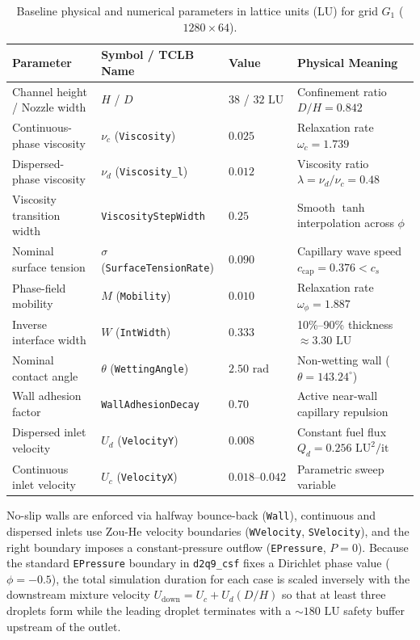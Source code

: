 \documentclass[11pt,a4paper]{article}
\begin{document}
\begin{table}[H]
\caption{Baseline physical and numerical parameters in lattice units (LU) for grid $G_1$ ($1280 \times 64$).}
\label{tab:setup}
\hspace{-1.5cm}
\begin{tabular}{@{}llll@{}}
\toprule
\textbf{Parameter} & \textbf{Symbol / TCLB Name} & \textbf{Value} & \textbf{Physical Meaning} \\
\midrule
Channel height / Nozzle width & $H$ / $D$ & $38$ / $32\text{ LU}$ & Confinement ratio $D/H = 0.842$ \\
Continuous-phase viscosity & $\nu_c$ (\texttt{Viscosity}) & $0.025$ & Relaxation rate $\omega_c = 1.739$ \\
Dispersed-phase viscosity & $\nu_d$ (\texttt{Viscosity\_l}) & $0.012$ & Viscosity ratio $\lambda = \nu_d/\nu_c = 0.48$ \\
Viscosity transition width & \texttt{ViscosityStepWidth} & $0.25$ & Smooth $\tanh$ interpolation across $\phi$ \\
Nominal surface tension & $\sigma$ (\texttt{SurfaceTensionRate}) & $0.090$ & Capillary wave speed $c_{\mathrm{cap}} = 0.376 < c_s$ \\
Phase-field mobility & $M$ (\texttt{Mobility}) & $0.010$ & Relaxation rate $\omega_\phi = 1.887$ \\
Inverse interface width & $W$ (\texttt{IntWidth}) & $0.333$ & 10\%--90\% thickness $\approx 3.30\text{ LU}$ \\
Nominal contact angle & $\theta$ (\texttt{WettingAngle}) & $2.50\text{ rad}$ & Non-wetting wall ($\theta = 143.24^\circ$) \\
Wall adhesion factor & \texttt{WallAdhesionDecay} & $0.70$ & Active near-wall capillary repulsion \\
Dispersed inlet velocity & $U_d$ (\texttt{VelocityY}) & $0.008$ & Constant fuel flux $Q_d = 0.256\text{ LU}^2/\text{it}$ \\
Continuous inlet velocity & $U_c$ (\texttt{VelocityX}) & $0.018\text{--}0.042$ & Parametric sweep variable \\
\bottomrule
\end{tabular}
\end{table}

No-slip walls are enforced via halfway bounce-back (\texttt{Wall}), continuous and dispersed inlets use Zou-He velocity boundaries (\texttt{WVelocity}, \texttt{SVelocity}), and the right boundary imposes a constant-pressure outflow (\texttt{EPressure}, $P = 0$). Because the standard \texttt{EPressure} boundary in \texttt{d2q9\_csf} fixes a Dirichlet phase value ($\phi = -0.5$), the total simulation duration for each case is scaled inversely with the downstream mixture velocity $U_{\mathrm{down}} = U_c + U_d(D/H)$ so that at least three droplets form while the leading droplet terminates with a $\sim 180\text{ LU}$ safety buffer upstream of the outlet.
\end{document}
